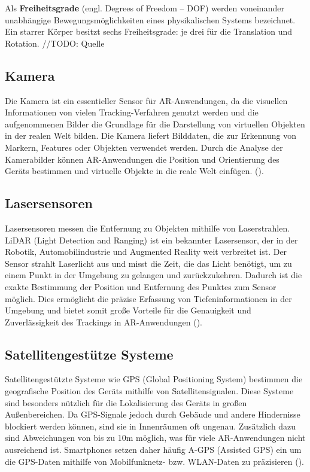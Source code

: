 \begin{tcolorbox}[colback=THAi-Blue!20!white, colframe=THAi-Blue]
    Als \textbf{Freiheitsgrade} (engl. Degrees of Freedom – DOF) werden voneinander unabhängige Bewegungsmöglichkeiten eines physikalischen Systems bezeichnet. Ein starrer Körper besitzt sechs Freiheitsgrade: je drei für die Translation und Rotation. //TODO: Quelle
\end{tcolorbox}
    

\subsection{Kamera}

Die Kamera ist ein essentieller Sensor für AR-Anwendungen, da die visuellen Informationen von vielen Tracking-Verfahren genutzt werden und die aufgenommenen Bilder die Grundlage für die Darstellung von virtuellen Objekten in der realen Welt bilden. Die Kamera liefert Bilddaten, die zur Erkennung von Markern, Features oder Objekten verwendet werden. Durch die Analyse der Kamerabilder können AR-Anwendungen die Position und Orientierung des Geräts bestimmen und virtuelle Objekte in die reale Welt einfügen. (\cite{doerner2022virtual}).

\subsection{Lasersensoren}

Lasersensoren messen die Entfernung zu Objekten mithilfe von Laserstrahlen. LiDAR (Light Detection and Ranging) ist ein bekannter Lasersensor, der in der Robotik, Automobilindustrie und Augmented Reality weit verbreitet ist. Der Sensor strahlt Laserlicht aus und misst die Zeit, die das Licht benötigt, um zu einem Punkt in der Umgebung zu gelangen und zurückzukehren. Dadurch ist die exakte Bestimmung der Position und Entfernung des Punktes zum Sensor möglich. Dies ermöglicht die präzise Erfassung von Tiefeninformationen in der Umgebung und bietet somit große Vorteile für die Genauigkeit und Zuverlässigkeit des Trackings in AR-Anwendungen (\cite{doerner2022virtual}).

\subsection{Satellitengestütze Systeme}

Satellitengestützte Systeme wie GPS (Global Positioning System) bestimmen die geografische Position des Geräts mithilfe von Satellitensignalen. Diese Systeme sind besonders nützlich für die Lokalisierung des Geräts in großen Außenbereichen. Da GPS-Signale jedoch durch Gebäude und andere Hindernisse blockiert werden können, sind sie in Innenräumen oft ungenau. Zusätzlich dazu sind Abweichungen von bis zu 10m möglich, was für viele AR-Anwendungen nicht ausreichend ist. Smartphones setzen daher häufig A-GPS (Assisted GPS) ein um die GPS-Daten mithilfe von Mobilfunknetz- bzw. WLAN-Daten zu präzisieren (\cite{doerner2022virtual}). 

